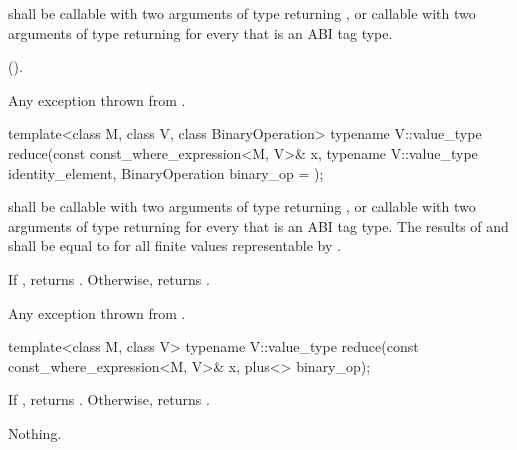 \begin{itemdescr}
  \pnum\requires
   shall be callable with two arguments of type  returning , or callable with two arguments of type  returning  for every  that is an ABI tag type.

  \pnum\returns
   \foralli ().

  \pnum\throws
  Any exception thrown from .

\end{itemdescr}

\begin{itemdecl}
template<class M, class V, class BinaryOperation>
  typename V::value_type reduce(const const_where_expression<M, V>& x,
                                typename V::value_type identity_element,
                                BinaryOperation binary_op = {});
\end{itemdecl}

\begin{itemdescr}
  \pnum\requires
   shall be callable with two arguments of type  returning , or callable with two arguments of type  returning  for every  that is an ABI tag type. The results of  and  shall be equal to  for all finite values  representable by .

  \pnum\returns
  If , returns . Otherwise, returns  \forallmaskedi.

  \pnum\throws
  Any exception thrown from .
\end{itemdescr}

\begin{itemdecl}
template<class M, class V>
  typename V::value_type reduce(const const_where_expression<M, V>& x, plus<> binary_op);
\end{itemdecl}

\begin{itemdescr}
  \pnum\returns
  If , returns . Otherwise, returns  \forallmaskedi.

  \pnum\throws Nothing.
\end{itemdescr}

